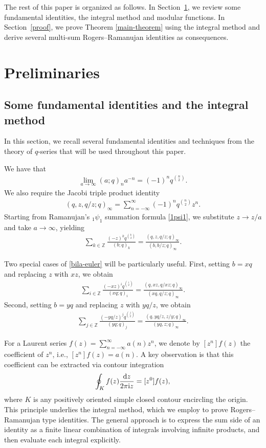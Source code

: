 \documentclass[10pt,a4paper]{amsart}
\numberwithin{equation}{section}
\theoremstyle{definition}
\begin{document}
The rest of this paper is organized as follows. In Section~\ref{sec-pre}, we review some fundamental identities, the integral method and modular functions. In Section~\ref{proof}, we prove Theorem \ref{main-theorem} using the integral method and derive several multi-sum Rogers--Ramanujan identities as consequences.

\section{Preliminaries}\label{sec-pre}
\subsection{Some fundamental identities and the integral method}
In this section, we recall several fundamental identities and techniques from the theory of $q$-series that will be used throughout this paper.\par
We have that
\begin{align*}
 \lim_{a\rightarrow \infty}(a;q)_na^{-n}=(-1)^{n}q^{\binom{n}{2}}.
\end{align*}
We also require the Jacobi triple product identity \cite[p.~15]{red}
\begin{align*}
 (q,z,q/z;q)_\infty=\sum_{n=-\infty}^{\infty}(-1)^nq^{\binom{n}{2}}z^n.
\end{align*}
Starting from Ramanujan's $_1\psi_1$ summation formula \eqref{1psi1}, we substitute $z\rightarrow z/a$ and take $a\rightarrow \infty$, yielding
\begin{align}\label{bila-euler}
 \sum_{k\in \mathbb{Z}} \frac{(-z)^kq^{\binom{k}{2}}}{(b;q)_k}=\frac{(q,z,q/z;q)_\infty}{(b,b/z;q)_\infty}.
\end{align}

Two special cases of \eqref{bila-euler} will be particularly useful. First, setting $b=xq$ and replacing $z$ with $xz$, we obtain
\begin{align}\label{circle-1}
 \sum_{i\in \mathbb{Z}} \frac{(-xz)^iq^{\binom{i}{2}}}{(xq;q)_i}=\frac{(q,xz,q/xz;q)_\infty}{(xq,q/z;q)_\infty}.
\end{align}
Second, setting $b=yq$ and replacing $z$ with $yq/z$, we obtain
\begin{align}\label{circle-2}
 \sum_{j\in \mathbb{Z}} \frac{(-yq/z)^jq^{\binom{j}{2}}}{(yq;q)_j}=\frac{(q,yq/z,z/y;q)_\infty}{(yq,z;q)_\infty}.
\end{align}

For a Laurent series \( f(z) = \sum_{n = -\infty}^\infty a(n) z^n \), we denote by \([z^n] f(z)\) the coefficient of \( z^n \), i.e., \([z^n] f(z) = a(n)\). A key observation is that this coefficient can be extracted via contour integration
\begin{align*}
 \oint_K f(z) \frac{{\rm d}z}{2\pi {\rm i} z} = [z^0] f(z),
\end{align*}
where \( K \) is any positively oriented simple closed contour encircling the origin. This principle underlies the integral method, which we employ to prove Rogers--Ramanujan type identities. The general approach is to express the sum side of an identity as a finite linear combination of integrals involving infinite products, and then evaluate each integral explicitly.
\end{document}

